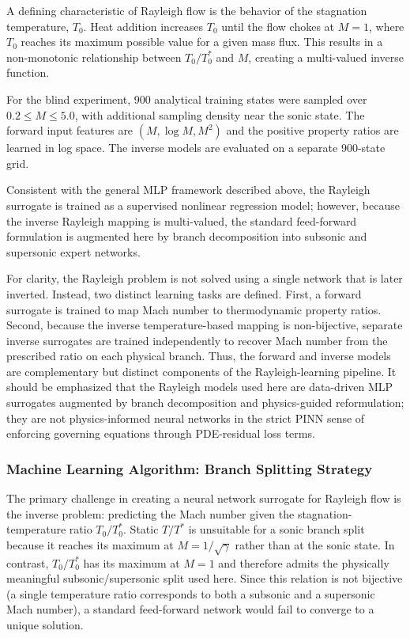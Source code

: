 \documentclass[preprint,12pt]{elsarticle}
\newcommand{\rev}[1]{#1}
\newcommand{\rev}[1]{\textcolor{revisionblue}{#1}}
\begin{document}
A defining characteristic of Rayleigh flow is the behavior of the stagnation temperature, $T_0$. Heat addition increases $T_0$ until the flow chokes at $M=1$, where $T_0$ reaches its maximum possible value for a given mass flux. This results in a non-monotonic relationship between $T_0/T_0^*$ and $M$, creating a multi-valued inverse function.

\rev{For the blind experiment, 900 analytical training states were sampled over $0.2\le M\le5.0$, with additional sampling density near the sonic state. The forward input features are $(M,\log M,M^2)$ and the positive property ratios are learned in log space. The inverse models are evaluated on a separate 900-state grid.}

Consistent with the general MLP framework described above, the Rayleigh surrogate is trained as a supervised nonlinear regression model; however, because the inverse Rayleigh mapping is multi-valued, the standard feed-forward formulation is augmented here by branch decomposition into subsonic and supersonic expert networks.

For clarity, the Rayleigh problem is not solved using a single network that is later inverted. Instead, two distinct learning tasks are defined. First, a forward surrogate is trained to map Mach number to thermodynamic property ratios. Second, because the inverse temperature-based mapping is non-bijective, separate inverse surrogates are trained independently to recover Mach number from the prescribed ratio on each physical branch. Thus, the forward and inverse models are complementary but distinct components of the Rayleigh-learning pipeline.
It should be emphasized that the Rayleigh models used here are data-driven MLP surrogates augmented by branch decomposition and physics-guided reformulation; they are not physics-informed neural networks in the strict PINN sense of enforcing governing equations through PDE-residual loss terms.

\subsubsection{Machine Learning Algorithm: Branch Splitting Strategy}
The primary challenge in creating a neural network surrogate for Rayleigh flow is the inverse problem: predicting the Mach number given \rev{the stagnation-temperature ratio $T_0/T_0^*$}. \rev{Static $T/T^*$ is unsuitable for a sonic branch split because it reaches its maximum at $M=1/\sqrt{\gamma}$ rather than at the sonic state. In contrast, $T_0/T_0^*$ has its maximum at $M=1$ and therefore admits the physically meaningful subsonic/supersonic split used here.} Since \rev{this relation is} not bijective (a single temperature ratio corresponds to both a subsonic and a supersonic Mach number), a standard feed-forward network would fail to converge to a unique solution.
\end{document}
